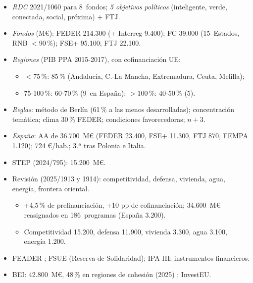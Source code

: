 \documentclass{article}
\begin{document}
\begin{columnas}
\begin{itemize}
\item \emph{RDC} 2021/1060 para 8~fondos; \emph{5 objetivos políticos} (inteligente, verde, conectada, social, próxima) + FTJ.
\item \emph{Fondos} (M€): FEDER 214.300 (+ Interreg 9.400); FC 39.000 (15~Estados, RNB $<$90\,\%); FSE+ 95.100; FTJ 22.100.
\item \emph{Regiones} (PIB PPA 2015-2017), con cofinanciación UE:
  \begin{itemize}
  \item $<$75\,\%: 85\,\% (Andalucía, C.-La Mancha, Extremadura, Ceuta, Melilla);
  \item 75-100\,\%: 60-70\,\% (9~en España); $>$100\,\%: 40-50\,\% (5).
  \end{itemize}
\item \emph{Reglas}: método de Berlín (61\,\% a las menos desarrolladas); concentración temática; clima 30\,\% FEDER; condiciones favorecedoras; $n+3$.
\item \emph{España}: AA de 36.700~M€ (FEDER 23.400, FSE+ 11.300, FTJ 870, FEMPA 1.120); 724 €/hab.; 3.ª tras Polonia e Italia.
\end{itemize}
\begin{itemize}
\item STEP (2024/795): 15.200~M€.
\item Revisión (2025/1913 y 1914): competitividad, defensa, vivienda, agua, energía, frontera oriental.
  \begin{itemize}
  \item +4,5\,\% de prefinanciación, +10 pp de cofinanciación; 34.600~M€ reasignados en 186~programas (España 3.200).
  \item Competitividad 15.200, defensa 11.900, vivienda 3.300, agua 3.100, energía 1.200.
  \end{itemize}
\end{itemize}
\begin{itemize}
\item FEADER ; FSUE (Reserva de Solidaridad); IPA III; instrumentos financieros.
\item BEI: 42.800~M€, 48\,\% en regiones de cohesión (2025) ; InvestEU.
\end{itemize}


\end{columnas}
\end{document}
